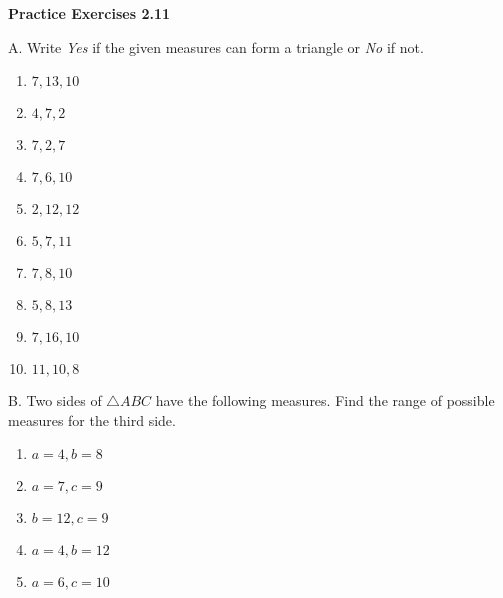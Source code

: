  \vspace{1ex}
\noindent\textbf{Practice Exercises 2.11}



A. Write \emph{Yes} if the given measures can form a triangle or \emph{No} if not.

\begin{multicols}{3}
\begin{enumerate}[noitemsep, label = \color{blue}\arabic*. ]%
   \item $ 7, 13, 10 $
   \item $ 4, 7, 2 $
   \item $ 7, 2, 7 $
   \item $ 7, 6, 10 $
   \item $ 2, 12, 12 $
   \item $ 5, 7, 11 $
   \item $ 7, 8, 10 $
   \item $ 5, 8, 13 $
   \item $ 7, 16, 10 $
   \item $ 11, 10, 8 $
\end{enumerate}
\end{multicols}
				
B. Two sides of $ \triangle ABC $ have the following measures.  Find the range of possible measures for the third side.

\begin{multicols}{2}
\begin{enumerate}[noitemsep, label = \color{blue}\arabic*. ]%
   \item $ a = 4, b = 8 $
   \item $ a = 7, c = 9 $
   \item $ b = 12, c = 9 $
   \item $ a = 4, b = 12 $
   \item $ a = 6, c = 10 $
\end{enumerate}
\end{multicols}
				
								
